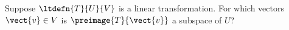 Suppose $\ltdefn{T}{U}{V}$ is a linear transformation.  For which vectors $\vect{v}\in V$ is $\preimage{T}{\vect{v}}$ a subspace of $U$?